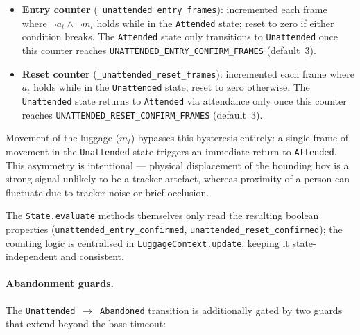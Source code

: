 \begin{itemize}
	\item \textbf{Entry counter}
	      (\texttt{\_unattended\_entry\_frames}): incremented each frame where
	      $\neg a_t \wedge \neg m_t$ holds while in the \texttt{Attended} state;
	      reset to zero if either condition breaks. The \texttt{Attended} state
	      only transitions to \texttt{Unattended} once this counter reaches
	      \texttt{UNATTENDED\_ENTRY\_CONFIRM\_FRAMES} (default~3).
	\item \textbf{Reset counter}
	      (\texttt{\_unattended\_reset\_frames}): incremented each frame where
	      $a_t$ holds while in the \texttt{Unattended} state; reset to zero
	      otherwise. The \texttt{Unattended} state returns to \texttt{Attended}
	      via attendance only once this counter reaches
	      \texttt{UNATTENDED\_RESET\_CONFIRM\_FRAMES} (default~3).
\end{itemize}

Movement of the luggage ($m_t$) bypasses this hysteresis entirely: a single
frame of movement in the \texttt{Unattended} state triggers an immediate return
to \texttt{Attended}. This asymmetry is intentional --- physical displacement
of the bounding box is a strong signal unlikely to be a tracker artefact,
whereas proximity of a person can fluctuate due to tracker noise or brief
occlusion.

The \texttt{State.evaluate} methods themselves only read the resulting boolean
properties (\texttt{unattended\_entry\_confirmed},
\texttt{unattended\_reset\_confirmed}); the counting logic is centralised in
\texttt{LuggageContext.update}, keeping it state-independent and consistent.

\paragraph{Abandonment guards.}
\label{sec:abandonment_guards}

The \texttt{Unattended}~$\to$~\texttt{Abandoned} transition is additionally
gated by two guards that extend beyond the base timeout:

